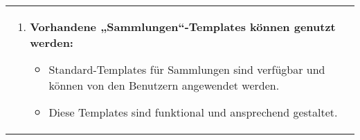 \begin{tabularx}{\textwidth}{L R}
\begin{enumerate}[left=0pt,label=\arabic*.,itemsep=0.4cm]
            \item \textbf{Vorhandene „Sammlungen“-Templates können genutzt werden:}
            \begin{itemize}[leftmargin=*]
                \item Standard-Templates für Sammlungen sind verfügbar und können von den Benutzern angewendet werden.
                \item Diese Templates sind funktional und ansprechend gestaltet.
            \end{itemize}

        \end{enumerate}
    \end{tabularx}

    \newpage
    \vspace{0.5cm}
